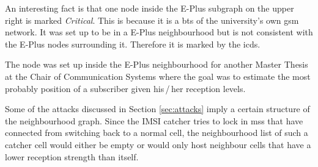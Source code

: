 An interesting fact is that one node inside the E-Plus subgraph on the upper right is marked \emph{Critical}.
This is because it is a \gls{bts} of the university's own \gls{gsm} network.
It was set up to be in a E-Plus neighbourhood but is not consistent with the E-Plus nodes surrounding it.
Therefore it is marked by the \gls{icds}.

The node was set up inside the E-Plus neighbourhood for another Master Thesis \cite{richy} at the Chair of Communication Systems where the goal was to estimate the most probably position of a subscriber given his\,/\,her reception levels.

Some of the attacks discussed in Section \ref{sec:attacks} imply a certain structure of the neighbourhood graph.
Since the IMSI catcher tries to lock in \glspl{ms} that have connected from switching back to a normal cell, the neighbourhood list of such a catcher cell would either be empty or would only host neighbour cells that have a lower reception strength than itself.

